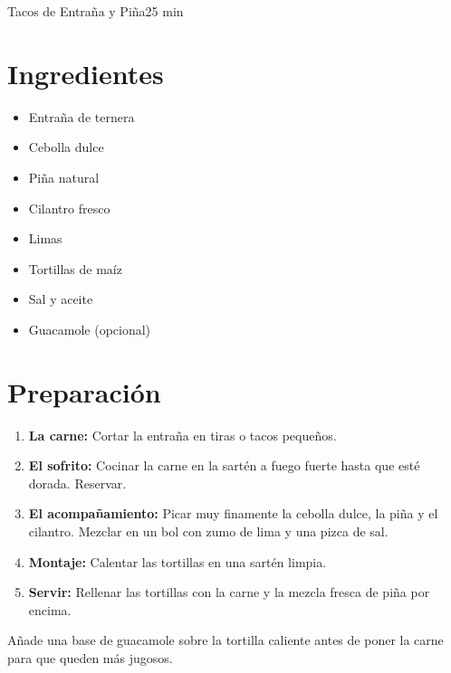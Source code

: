 \begin{receta}{Tacos de Entraña y Piña}{25 min}
    
    \begin{minipage}[t]{0.35\textwidth}
        \section*{Ingredientes}
        \begin{itemize}[leftmargin=*]
            \item Entraña de ternera
            \item Cebolla dulce
            \item Piña natural
            \item Cilantro fresco
            \item Limas
            \item Tortillas de maíz
            \item Sal y aceite
            \item Guacamole (opcional)
        \end{itemize}
    \end{minipage}
    \hfill
    \begin{minipage}[t]{0.6\textwidth}
        \section*{Preparación}
        \begin{enumerate}
            \item \textbf{La carne:} Cortar la entraña en tiras o tacos pequeños.
            \item \textbf{El sofrito:} Cocinar la carne en la sartén a fuego fuerte hasta que esté dorada. Reservar.
            \item \textbf{El acompañamiento:} Picar muy finamente la cebolla dulce, la piña y el cilantro. Mezclar en un bol con zumo de lima y una pizca de sal.
            \item \textbf{Montaje:} Calentar las tortillas en una sartén limpia.
            \item \textbf{Servir:} Rellenar las tortillas con la carne y la mezcla fresca de piña por encima.
        \end{enumerate}
    \end{minipage}

    \vspace{1em}
    \begin{tcolorbox}[colback=orange!5, colframe=orange!50, title=Toque Extra, size=small]
        Añade una base de guacamole sobre la tortilla caliente antes de poner la carne para que queden más jugosos.
    \end{tcolorbox}
\end{receta}